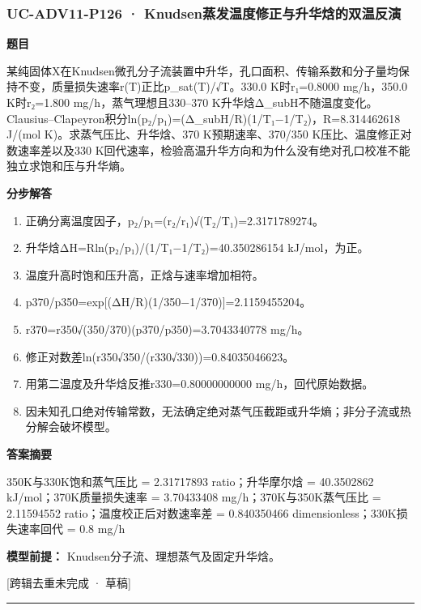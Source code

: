 \documentclass[UTF8,11pt,a4paper]{ctexart}
\begin{document}
\subsubsection*{UC-ADV11-P126 · Knudsen蒸发温度修正与升华焓的双温反演}
\noindent\textbf{题目}\par
某纯固体X在Knudsen微孔分子流装置中升华，孔口面积、传输系数和分子量均保持不变，质量损失速率r(T)正比p\_sat(T)/√T。330.0 K时r₁=0.8000 mg/h，350.0 K时r₂=1.800 mg/h，蒸气理想且330–370 K升华焓Δ\_subH不随温度变化。Clausius–Clapeyron积分ln(p₂/p₁)=(Δ\_subH/R)(1/T₁−1/T₂)，R=8.314462618 J/(mol K)。求蒸气压比、升华焓、370 K预期速率、370/350 K压比、温度修正对数速率差以及330 K回代速率，检验高温升华方向和为什么没有绝对孔口校准不能独立求饱和压与升华熵。\par
\medskip\noindent\textbf{分步解答}
\begin{enumerate}
\item 正确分离温度因子，p₂/p₁=(r₂/r₁)√(T₂/T₁)=2.3171789274。
\item 升华焓ΔH=Rln(p₂/p₁)/(1/T₁−1/T₂)=40.350286154 kJ/mol，为正。
\item 温度升高时饱和压升高，正焓与速率增加相符。
\item p370/p350=exp[(ΔH/R)(1/350−1/370)]=2.1159455204。
\item r370=r350√(350/370)(p370/p350)=3.7043340778 mg/h。
\item 修正对数差ln(r350√350/(r330√330))=0.84035046623。
\item 用第二温度及升华焓反推r330=0.80000000000 mg/h，回代原始数据。
\item 因未知孔口绝对传输常数，无法确定绝对蒸气压截距或升华熵；非分子流或热分解会破坏模型。
\end{enumerate}
\noindent\textbf{答案摘要}\par
350K与330K饱和蒸气压比 = 2.31717893 ratio；升华摩尔焓 = 40.3502862 kJ/mol；370K质量损失速率 = 3.70433408 mg/h；370K与350K蒸气压比 = 2.11594552 ratio；温度校正后对数速率差 = 0.840350466 dimensionless；330K损失速率回代 = 0.8 mg/h\par
\noindent\textbf{模型前提：}
Knudsen分子流、理想蒸气及固定升华焓。\par
\noindent\textcolor{red!65!black}{[跨辑去重未完成 · 草稿]} \par
\medskip\hrule\medskip
{}
\end{document}
